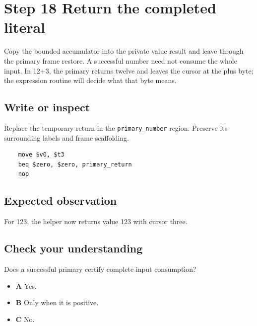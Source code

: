 \section{Step 18 Return the completed literal}\label{expression-s18}

Copy the bounded accumulator into the private value result and leave through the primary frame restore. A successful number need not consume the whole input. In 12+3, the primary returns twelve and leaves the cursor at the plus byte; the expression routine will decide what that byte means.

\subsection{Write or inspect}
Replace the temporary return in the \texttt{primary\_number} region. Preserve its surrounding labels and frame scaffolding.

\begin{verbatim}
    move $v0, $t3
    beq $zero, $zero, primary_return
    nop
\end{verbatim}
\subsection{Expected observation}
For 123, the helper now returns value 123 with cursor three.

\subsection{Check your understanding}
Does a successful primary certify complete input consumption?

\begin{itemize}
  \item \textbf{A} Yes.
  \item \textbf{B} Only when it is positive.
  \item \textbf{C} No.
\end{itemize}
